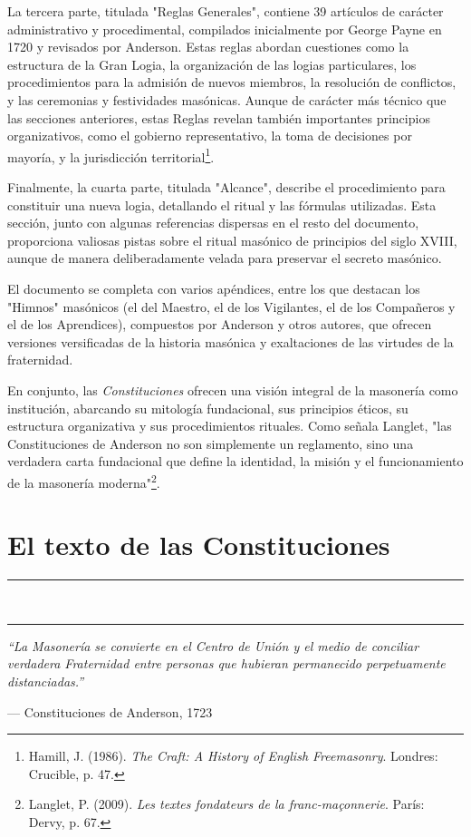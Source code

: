 \documentclass[a4paper,12pt,twoside]{book}
\newcommand{\ornline}{%
\begin{center}
\textcolor{dorado}{{\LARGE\rule{0.2\textwidth}{0.4pt}}~\scalebox{1.2}{❧}~\scalebox{1.2}{❧}~\scalebox{1.2}{❧}~
{\LARGE\rule{0.2\textwidth}{0.4pt}}}
\end{center}}
\begin{document}
La tercera parte, titulada "Reglas Generales", contiene 39 artículos de carácter administrativo y procedimental, compilados inicialmente por George Payne en 1720 y revisados por Anderson. Estas reglas abordan cuestiones como la estructura de la Gran Logia, la organización de las logias particulares, los procedimientos para la admisión de nuevos miembros, la resolución de conflictos, y las ceremonias y festividades masónicas. Aunque de carácter más técnico que las secciones anteriores, estas Reglas revelan también importantes principios organizativos, como el gobierno representativo, la toma de decisiones por mayoría, y la jurisdicción territorial\footnote{Hamill, J. (1986). \textit{The Craft: A History of English Freemasonry}. Londres: Crucible, p. 47.}.

Finalmente, la cuarta parte, titulada "Alcance", describe el procedimiento para constituir una nueva logia, detallando el ritual y las fórmulas utilizadas. Esta sección, junto con algunas referencias dispersas en el resto del documento, proporciona valiosas pistas sobre el ritual masónico de principios del siglo XVIII, aunque de manera deliberadamente velada para preservar el secreto masónico.

El documento se completa con varios apéndices, entre los que destacan los "Himnos" masónicos (el del Maestro, el de los Vigilantes, el de los Compañeros y el de los Aprendices), compuestos por Anderson y otros autores, que ofrecen versiones versificadas de la historia masónica y exaltaciones de las virtudes de la fraternidad.

En conjunto, las \textit{Constituciones} ofrecen una visión integral de la masonería como institución, abarcando su mitología fundacional, sus principios éticos, su estructura organizativa y sus procedimientos rituales. Como señala Langlet, "las Constituciones de Anderson no son simplemente un reglamento, sino una verdadera carta fundacional que define la identidad, la misión y el funcionamiento de la masonería moderna"\footnote{Langlet, P. (2009). \textit{Les textes fondateurs de la franc-maçonnerie}. París: Dervy, p. 67.}.

\chapter{El texto de las Constituciones}

\ornline
\vspace{1cm}

\epigraph{\textit{``La Masonería se convierte en el Centro de Unión y el medio de conciliar verdadera Fraternidad entre personas que hubieran permanecido perpetuamente distanciadas.''}}{--- Constituciones de Anderson, 1723}
\end{document}

